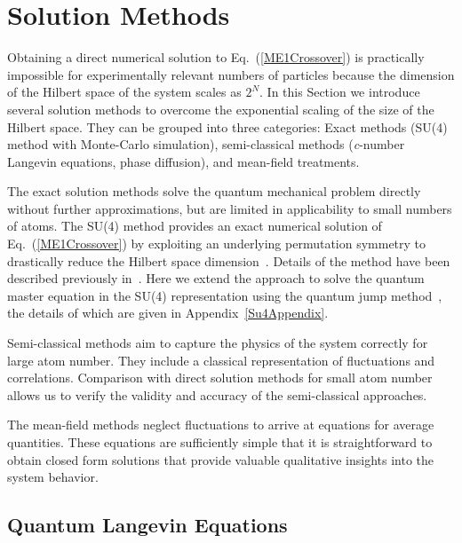 \documentclass[aps,
twocolumn,
showpacs,
superscriptaddress,groupedaddress]{revtex4}
\begin{document}
\section{Solution Methods}
\label{sec:Methods}

Obtaining a direct numerical solution to Eq.~(\ref{ME1Crossover}) is
practically impossible for experimentally relevant numbers of
particles because the dimension of the Hilbert space of the system
scales as $2^N$.  In this Section we introduce several solution
methods to overcome the exponential scaling of the size of the Hilbert
space.  They can be grouped into three categories: Exact methods
(SU(4) method with Monte-Carlo simulation), semi-classical methods
({\it c}-number Langevin equations, phase diffusion), and mean-field
treatments.

The exact solution methods solve the quantum mechanical problem
directly without further approximations, but are limited in
applicability to small numbers of atoms. The SU(4) method provides an
exact numerical solution of Eq.~(\ref{ME1Crossover}) by exploiting an
underlying permutation symmetry to drastically reduce the Hilbert
space dimension~\cite{Hartmann:arXiv1201.1732,
  PhysRevA.87.062101}. Details of the method have been described
previously in~\cite{PhysRevA.87.062101}. Here we extend the approach
to solve the quantum master equation in the SU(4) representation using
the quantum jump method~\cite{Dalibard92,Dum92,Knight98}, the details
of which are given in Appendix~\ref{Su4Appendix}.

Semi-classical methods aim to capture the physics of the system
correctly for large atom number.  They include a classical
representation of fluctuations and correlations.  Comparison with
direct solution methods for small atom number allows us to verify the
validity and accuracy of the semi-classical approaches.

The mean-field methods neglect fluctuations to arrive at equations for
average quantities. These equations are sufficiently simple that it is
straightforward to obtain closed form solutions that provide valuable
qualitative insights into the system behavior.



\subsection{Quantum Langevin Equations}
\end{document}
